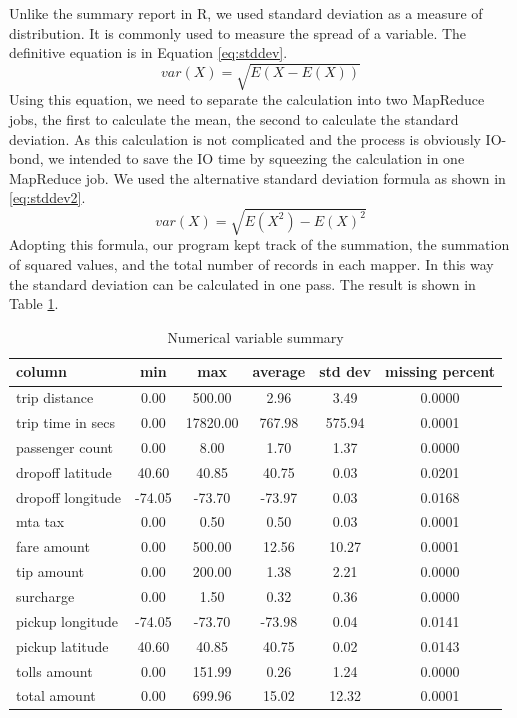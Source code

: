 \documentclass[12pt,a4paper]{article}
\begin{document}
  Unlike the summary report in R, we used standard deviation as a measure of distribution. It is commonly used to measure the spread of a variable. The definitive equation is in Equation \ref{eq:stddev}.
  \begin{equation}
    \label{eq:stddev}
    var(X) = \sqrt{E(X-E(X))}
  \end{equation}
  Using this equation, we need to separate the calculation into two MapReduce jobs, the first to calculate the mean, the second to calculate the standard deviation. As this calculation is not complicated and the process is obviously IO-bond, we intended to save the IO time by squeezing the calculation in one MapReduce job. We used the alternative standard deviation formula as shown in \ref{eq:stddev2}. 
  \begin{equation}
    \label{eq:stddev2}
    var(X) = \sqrt{E(X^2)-E(X)^2}
  \end{equation}
  Adopting this formula, our program kept track of the summation, the summation of squared values, and the total number of records in each mapper. In this way the standard deviation can be calculated in one pass. The result is shown in Table \ref{tab:numsum}.
  \begin{table}[h]
    \centering
    \caption{Numerical variable summary}
    \label{tab:numsum}
    \begin{tabular}{|l|c|c|c|c|c|} \hline
      column	&	min	&	max	&	average	&	std dev	&	missing percent \\ \hline
      trip distance	&	0.00	&	500.00	&	2.96	&	3.49	&	0.0000 \\ \hline
      trip time in secs	&	0.00	&	17820.00	&	767.98	&	575.94	&	0.0001 \\ \hline
      passenger count	&	0.00	&	8.00	&	1.70	&	1.37	&	0.0000 \\ \hline
      dropoff latitude	&	40.60	&	40.85	&	40.75	&	0.03	&	0.0201 \\ \hline
      dropoff longitude	&	-74.05	&	-73.70	&	-73.97	&	0.03	&	0.0168 \\ \hline
      mta tax	&	0.00	&	0.50	&	0.50	&	0.03	&	0.0001 \\ \hline
      fare amount	&	0.00	&	500.00	&	12.56	&	10.27	&	0.0001 \\ \hline
      tip amount	&	0.00	&	200.00	&	1.38	&	2.21	&	0.0000 \\ \hline
      surcharge	&	0.00	&	1.50	&	0.32	&	0.36	&	0.0000 \\ \hline
      pickup longitude	&	-74.05	&	-73.70	&	-73.98	&	0.04	&	0.0141 \\ \hline
      pickup latitude	&	40.60	&	40.85	&	40.75	&	0.02	&	0.0143 \\ \hline
      tolls amount	&	0.00	&	151.99	&	0.26	&	1.24	&	0.0000 \\ \hline
      total amount	&	0.00	&	699.96	&	15.02	&	12.32	&	0.0001 \\ \hline
    \end{tabular}
  \end{table}
\end{document}

